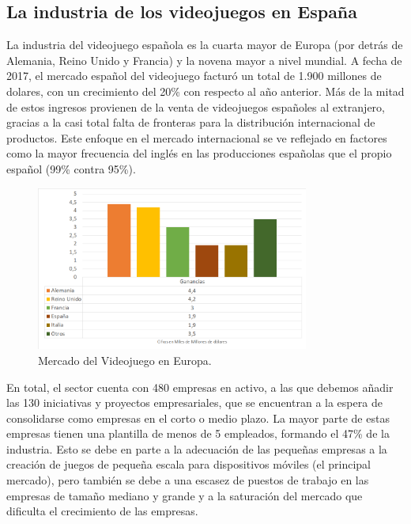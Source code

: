 \subsection{La industria de los videojuegos en España}
La industria del videojuego española es la cuarta mayor de Europa (por detrás de Alemania, Reino Unido y Francia) y la novena mayor a nivel mundial. A fecha de 2017, el mercado español del videojuego facturó un total de 1.900 millones de dolares, con un crecimiento del 20\% con respecto al año anterior. Más de la mitad de estos ingresos provienen de la venta de videojuegos españoles al extranjero, gracias a la casi total falta de fronteras para la distribución internacional de productos. Este enfoque en el mercado internacional se ve reflejado en factores como la mayor frecuencia del inglés en las producciones españolas que el propio español (99\% contra 95\%)\cite{libro_blanco}.

\begin{figure}[h]
    \centering
    \includegraphics[width=0.8\textwidth]{images/estadodelarte/mercado/distribucion-mercado-europa}
    \caption{Mercado del Videojuego en Europa.}
\end{figure}

En total, el sector cuenta con 480 empresas en activo, a las que debemos añadir las 130 iniciativas y proyectos empresariales, que se encuentran a la espera de consolidarse como empresas en el corto o medio plazo. La mayor parte de estas empresas tienen una plantilla de menos de 5 empleados, formando el 47\% de la industria. Esto se debe en parte a la adecuación de las pequeñas empresas a la creación de juegos de pequeña escala para dispositivos móviles (el principal mercado), pero también se debe a una escasez de puestos de trabajo en las empresas de tamaño mediano y grande y a la saturación del mercado que dificulta el crecimiento de las empresas\cite{libro_blanco}.

